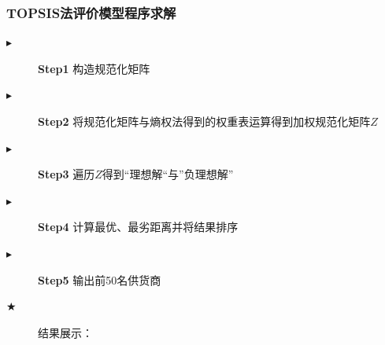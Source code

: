 \documentclass{cumcmthesis}
\begin{document}
\subsubsection*{TOPSIS法评价模型程序求解}
\begin{description}
     \item[$\blacktriangleright$] \textbf{Step1} 构造规范化矩阵
     \item[$\blacktriangleright$] \textbf{Step2} 将规范化矩阵与熵权法得到的权重表运算得到加权规范化矩阵$Z$
     \item[$\blacktriangleright$] \textbf{Step3} 遍历$Z$得到“理想解“与”负理想解”
     \item[$\blacktriangleright$] \textbf{Step4} 计算最优、最劣距离并将结果排序
     \item[$\blacktriangleright$] \textbf{Step5} 输出前50名供货商
\end{description}
\newpage
\begin{description}
\item[$\bigstar$] 结果展示：
\end{description}
\end{document}
